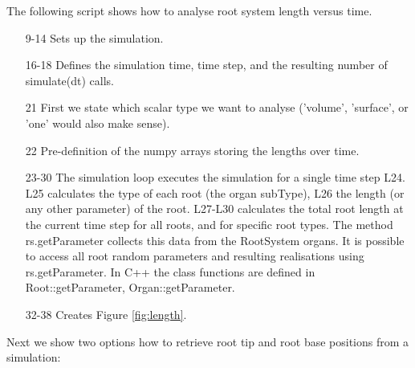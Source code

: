 
The following script shows how to analyse root system length versus time. 



\begin{itemize}
\item[9-14] Sets up the simulation.

\item[16-18] Defines the simulation time, time step, and the resulting number of simulate(dt) calls. 

\item[21] First we state which scalar type we want to analyse ('volume', 'surface', or 'one' would also make sense). 

\item[22] Pre-definition of the numpy arrays storing the lengths over time. 

\item[23-30] The simulation loop executes the simulation for a single time step L24. L25 calculates the type of each root (the organ subType), L26 the length (or any other parameter) of the root. L27-L30 calculates the total root length at the current time step for all roots, and for specific root types. The method rs.getParameter collects this data from the RootSystem organs. It is possible to access all root random parameters and resulting realisations using rs.getParameter. In C++ the class functions are defined in Root::getParameter, Organ::getParameter. 

\item[32-38] Creates Figure \ref{fig:length}.

\end{itemize}



Next we show two options how to retrieve root tip and root base positions from a simulation:



